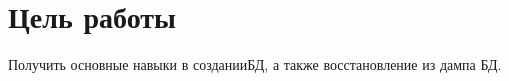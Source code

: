 \thispagestyle{empty}
\section*{Цель работы}

Получить основные навыки в созданииБД, а также восстановление из дампа БД.